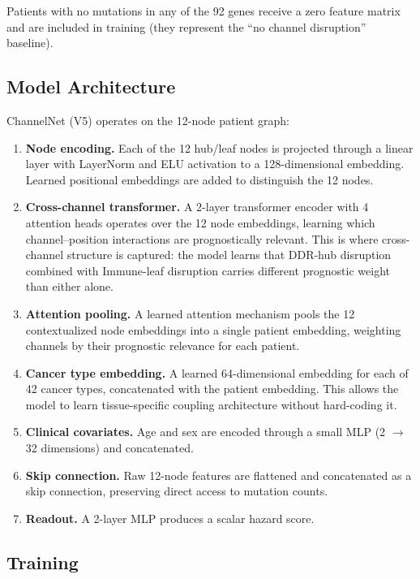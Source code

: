 \documentclass[11pt]{article}
\begin{document}
Patients with no mutations in any of the 92 genes receive a
zero feature matrix and are included in training (they represent
the ``no channel disruption'' baseline).

\subsection{Model Architecture}

ChannelNet (V5) operates on the 12-node patient graph:

\begin{enumerate}
\item \textbf{Node encoding.} Each of the 12 hub/leaf nodes is
   projected through a linear layer with LayerNorm and ELU
   activation to a 128-dimensional embedding. Learned positional
   embeddings are added to distinguish the 12 nodes.
\item \textbf{Cross-channel transformer.} A 2-layer transformer
   encoder with 4 attention heads operates over the 12 node
   embeddings, learning which channel--position interactions are
   prognostically relevant. This is where cross-channel structure
   is captured: the model learns that DDR-hub disruption combined
   with Immune-leaf disruption carries different prognostic
   weight than either alone.
\item \textbf{Attention pooling.} A learned attention mechanism
   pools the 12 contextualized node embeddings into a single
   patient embedding, weighting channels by their prognostic
   relevance for each patient.
\item \textbf{Cancer type embedding.} A learned 64-dimensional
   embedding for each of 42 cancer types, concatenated with the
   patient embedding. This allows the model to learn
   tissue-specific coupling architecture without hard-coding it.
\item \textbf{Clinical covariates.} Age and sex are encoded
   through a small MLP (2 $\to$ 32 dimensions) and concatenated.
\item \textbf{Skip connection.} Raw 12-node features are
   flattened and concatenated as a skip connection, preserving
   direct access to mutation counts.
\item \textbf{Readout.} A 2-layer MLP produces a scalar hazard
   score.
\end{enumerate}

\subsection{Training}
\end{document}
